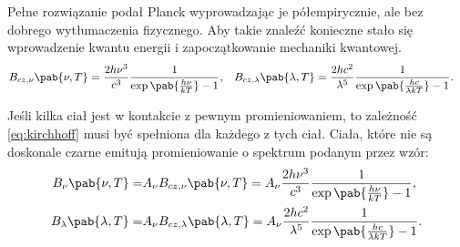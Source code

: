 Pełne rozwiązanie podał Planck wyprowadzając je półempirycznie, ale bez dobrego wytłumaczenia fizycznego. Aby takie znaleźć konieczne stało się wprowadzenie kwantu energii i zapoczątkowanie mechaniki kwantowej. 
\begin{align}
	B_{cz, \nu}\pab{\nu, T} &= \frac{2h\nu^3}{c^3}\inv{\exp\pab{\frac{h\nu}{kT}} - 1}, & 
	B_{cz, \lambda}\pab{\lambda, T} &= \frac{2hc^2}{\lambda^5}\inv{\exp\pab{\frac{hc}{\lambda kT}} - 1}.
\end{align}

Jeśli kilka ciał jest w kontakcie z pewnym promieniowaniem, to zależność \eqref{eq:kirchhoff} musi być spełniona dla każdego z tych ciał. Ciała, które nie są doskonale czarne emitują promieniowanie o spektrum podanym przez wzór:
\begin{align*}
	B_{\nu}\pab{\nu, T} =& A_{\nu} B_{cz, \nu}\pab{\nu, T} = A_{\nu} \frac{2h\nu^3}{c^3}\inv{\exp\pab{\frac{h\nu}{kT}} - 1}, \\
	B_{\lambda}\pab{\lambda, T} =& A_{\nu} B_{cz, \lambda}\pab{\lambda, T} = A_{\nu} \frac{2hc^2}{\lambda^5}\inv{\exp\pab{\frac{hc}{\lambda kT}} - 1}.
\end{align*}